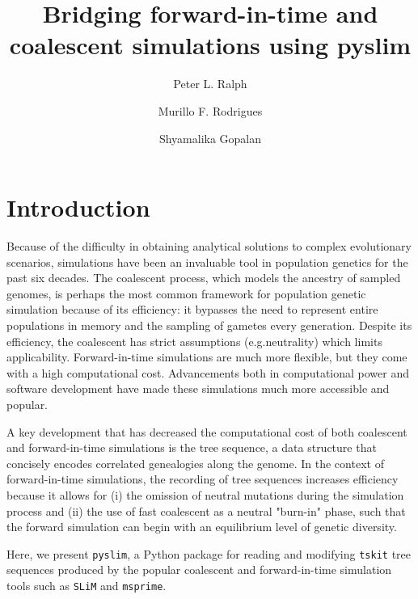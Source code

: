 \documentclass[12pt]{article}
\newcommand{\tskit}[0]{\texttt{tskit}\xspace}
\newcommand*{\eg}{e.g.\xcomma}
\begin{document}
\title{Bridging forward-in-time and coalescent simulations using pyslim}
\author[1,2]{Peter L. Ralph}
\author[3]{Murillo F. Rodrigues}
\author[4]{Shyamalika Gopalan}


\maketitle

\date{}

\section*{Introduction}
Because of the difficulty in obtaining analytical solutions to complex evolutionary scenarios, simulations have been an invaluable tool in population genetics for the past six decades.
The coalescent process, which models the ancestry of sampled genomes, is perhaps the most common framework for population genetic simulation because of its efficiency: it bypasses the need to represent entire populations in memory and the sampling of gametes every generation.
Despite its efficiency, the coalescent has strict assumptions (\eg neutrality) which limits applicability.
Forward-in-time simulations are much more flexible, but they come with a high computational cost.
Advancements both in computational power and software development have made these simulations much more accessible and popular.

A key development that has decreased the computational cost of both coalescent and forward-in-time simulations is the tree sequence, a data structure that concisely encodes correlated genealogies along the genome.
In the context of forward-in-time simulations, the recording of tree sequences increases efficiency because it allows for (i) the omission of neutral mutations during the simulation process and (ii) the use of fast coalescent as a neutral "burn-in" phase, such that the forward simulation can begin with an equilibrium level of genetic diversity.

Here, we present \texttt{pyslim}, a Python package for reading and modifying \tskit tree sequences produced by the popular coalescent and forward-in-time simulation tools such as \texttt{SLiM} and \texttt{msprime}.
\end{document}
